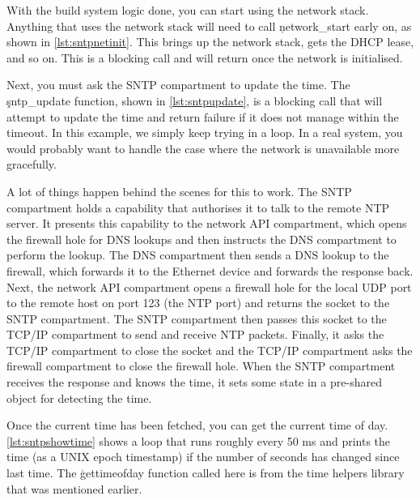 \lualisting[filename=examples/sntp/xmake.lua,marker=network_stack_threads,label=lst:xmakenetthreads,caption="Build system code for defining the network stack's threads."]{}

With the build system logic done, you can start using the network stack.
Anything that uses the network stack will need to call \c{network_start} early on, as shown in \ref{lst:sntpnetinit}.
This brings up the network stack, gets the DHCP lease, and so on.
This is a blocking call and will return once the network is initialised.

\codelisting[filename=examples/sntp/sntp.cc,marker=network_init,label=lst:sntpnetinit,caption="Initialisation for the network stack."]{}

Next, you must ask the SNTP compartment to update the time.
The \c{sntp_update} function, shown in \ref{lst:sntpupdate}, is a blocking call that will attempt to update the time and return failure if it does not manage within the timeout.
In this example, we simply keep trying in a loop.
In a real system, you would probably want to handle the case where the network is unavailable more gracefully.

\codelisting[filename=examples/sntp/sntp.cc,marker=sntp_update,label=lst:sntpupdate,caption="Updating the time from the SNTP server."]{}

A lot of things happen behind the scenes for this to work.
The SNTP compartment holds a capability that authorises it to talk to the remote NTP server.
It presents this capability to the network API compartment, which opens the firewall hole for DNS lookups and then instructs the DNS compartment to perform the lookup.
The DNS compartment then sends a DNS lookup to the firewall, which forwards it to the Ethernet device and forwards the response back.
Next, the network API compartment opens a firewall hole for the local UDP port to the remote host on port 123 (the NTP port) and returns the socket to the SNTP compartment.
The SNTP compartment then passes this socket to the TCP/IP compartment to send and receive NTP packets.
Finally, it asks the TCP/IP compartment to close the socket and the TCP/IP compartment asks the firewall compartment to close the firewall hole.
When the SNTP compartment receives the response and knows the time, it sets some state in a pre-shared object for detecting the time.

Once the current time has been fetched, you can get the current time of day.
\ref{lst:sntpshowtime} shows a loop that runs roughly every 50 ms and prints the time (as a UNIX epoch timestamp) if the number of seconds has changed since last time.
The \c{gettimeofday} function called here is from the time helpers library that was mentioned earlier.

